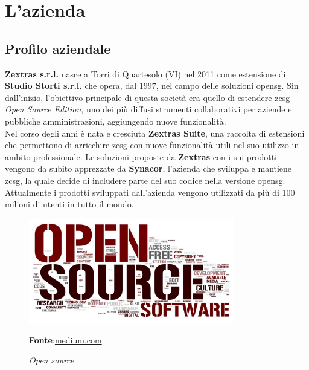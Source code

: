
\chapter{L'azienda}
\label{cap:azienda}

\section{Profilo aziendale}
    \textbf{Zextras s.r.l.} nasce a Torri di Quartesolo (VI) nel 2011 come estensione di \textbf{Studio Storti s.r.l.} che opera, dal 1997, nel campo delle soluzioni \gls{opensg}. Sin dall'inizio, l'obiettivo principale di questa società era quello di estendere \gls{zcsg} \textit{Open Source Edition}, uno dei più diffusi strumenti collaborativi per aziende e pubbliche amministrazioni, aggiungendo nuove funzionalità. \\
    Nel corso degli anni è nata e cresciuta \textbf{Zextras Suite}, una raccolta di estensioni che permettono di arricchire \gls{zcsg} con nuove funzionalità utili nel suo utilizzo in ambito professionale.
    Le soluzioni proposte da \textbf{Zextras} con i sui prodotti vengono da subito apprezzate da \textbf{Synacor}, l'azienda che sviluppa e mantiene \gls{zcsg}, la quale decide di includere parte del suo codice nella versione \gls{opensg}. Attualmente i prodotti sviluppati dall'azienda vengono utilizzati da più di 100 milioni di utenti in tutto il mondo.

    \begin{figure}[h]
            \centering
            \includegraphics[width=0.8\textwidth]{immagini/opensource.jpeg}
            \caption{\textit{Open source}}
            \textbf{Fonte}:\href{https://miro.medium.com/max/2048/1*MnJBb5qalimr1Ji7bKJctQ.jpeg}{medium.com}
            \label{fig: Open source}
        \end{figure}

